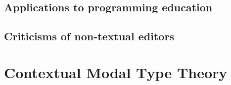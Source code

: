 
\subsection{Applications to programming education}
\label{sec:programming-education}

\subsection{Criticisms of non-textual editors}
\label{sec:textual-benefits}

\section{Contextual Modal Type Theory}
\label{sec:cmtt}


